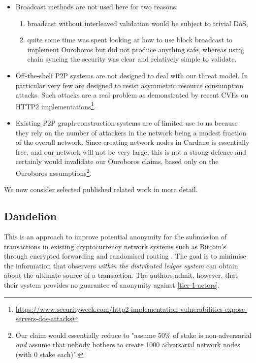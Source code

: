 \documentclass[11pt,a4paper]{article}
\begin{document}
\begin{itemize}
\item
  Broadcast methods are not used here for two reasons:

  \begin{enumerate}
  \def\labelenumi{\alph{enumi}.}
  \item
    broadcast without interleaved validation would be subject to trivial
    DoS,
  \item
    quite some time was spent looking at how to use block broadcast to
    implement Ouroboros but did not produce anything safe, whereas using
    chain syncing the security was clear and relatively simple to
    validate.
  \end{enumerate}
\item
  Off-the-shelf P2P systems are not designed to deal with our threat
  model. In particular very few are designed to resist asymmetric
  resource consumption attacks. Such attacks are a real problem as
  demonstrated by recent CVEs on HTTP2 implementations\footnote{\href{https://www.securityweek.com/http2-implementation-vulnerabilities-expose-servers-dos-attacks}{{https://www.securityweek.com/http2-implementation-vulnerabilities-expose-servers-dos-attacks}}}.
\item
  Existing P2P graph-construction systems are of limited use to us
  because they rely on the number of attackers in the network being a
  modest fraction of the overall network. Since creating network nodes
  in Cardano is essentially free, and our network will not be very
  large, this is not a strong defence and certainly would invalidate our
  Ouroboros claims, based only on the Ouroboros assumptions\footnote{Our
    claim would essentially reduce to "assume 50\% of stake is
    non-adversarial \emph{and} assume that nobody bothers to create
    1000 adversarial network nodes (with 0 stake each)".}.
\end{itemize}

We now consider selected published related work in more detail.

\subsection{Dandelion}
\label{dandelion}

This is an approach to improve potential anonymity for the submission of
transactions in existing cryptocurrency network systems such as
Bitcoin's through encrypted forwarding and randomised routing
\cite{VFV17}. The goal is to minimise the information that observers
\emph{within the distributed ledger} \emph{system} can obtain about the
ultimate source of a transaction. The authors admit, however, that their
system provides no guarantee of anonymity against
\cref{tier-1-actors}.
\end{document}
